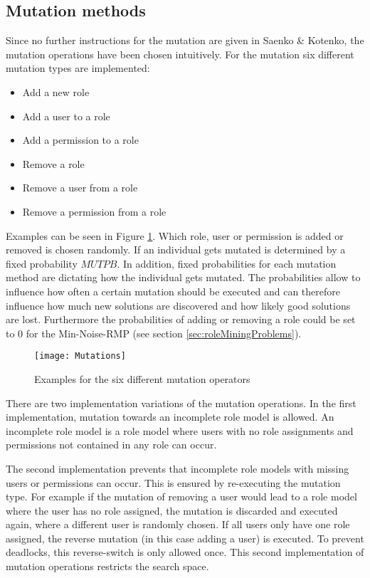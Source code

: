         \subsection{Mutation methods}
        Since no further instructions for the mutation are given in Saenko \& Kotenko\cite{saenko2012design}, the mutation operations have been chosen intuitively. For the mutation six different mutation types are implemented:
        
        \begin{itemize}
            \setlength{\itemsep}{1pt}
            \item Add a new role
            \item Add a user to a role
            \item Add a permission to a role
            \item Remove a role
            \item Remove a user from a role
            \item Remove a permission from a role
        \end{itemize}
        
        Examples can be seen in Figure \ref{fig:mutationOperations}. Which role, user or permission is added or removed is chosen randomly. If an individual gets mutated is determined by a fixed probability $MUTPB$. In addition, fixed probabilities for each mutation method are dictating how the individual gets mutated. The probabilities allow to influence how often a certain mutation should be executed and can therefore influence how much new solutions are discovered and how likely good solutions are lost. Furthermore the probabilities of adding or removing a role could be set to 0 for the Min-Noise-RMP (see section \ref{sec:roleMiningProblems}).
        
        \begin{figure}[H]
              	\centering
              	\texttt{[image: Mutations]}
              	\caption{Examples for the six different mutation operators}
              	\label{fig:mutationOperations}
        \end{figure}
                
        There are two implementation variations of the mutation operations. In the first implementation, mutation towards an incomplete role model is allowed. An incomplete role model is a role model where users with no role assignments and permissions not contained in any role can occur.
       
        The second implementation prevents that incomplete role models with missing users or permissions can occur. This is ensured by re-executing the mutation type. For example if the mutation of removing a user would lead to a role model where the user has no role assigned, the mutation is discarded and executed again, where a different user is randomly chosen. If all users only have one role assigned, the reverse mutation (in this case adding a user) is executed. To prevent deadlocks, this reverse-switch is only allowed once. This second implementation of mutation operations restricts the search space. 
        
